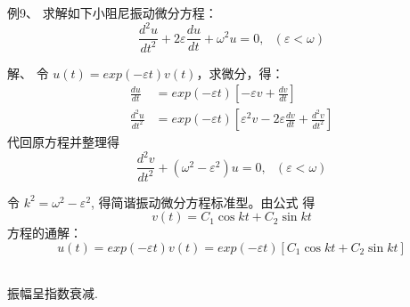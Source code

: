 \begin{frame}
	\begin{exampleblock} {例9、	求解如下小阻尼振动微分方程：}
	\begin{equation*}
		\frac{d^2 u}{d t^2} +2\varepsilon \frac{d u}{dt} +\omega ^2 u = 0 ,  ~~~ (\varepsilon < \omega)   
	\end{equation*}
	\end{exampleblock} 
	\alert{解、} 令 $\displaystyle  u(t)= exp(-\varepsilon t) v(t) $，求微分，得：\\	
	\begin{align*}
		\frac{d u}{d t } & =exp(-\varepsilon t) [-\varepsilon v +\frac{d v}{dt}]\\
		\frac{d^2 u}{d t^2 } & =exp(-\varepsilon t) [\varepsilon ^2 v -2\varepsilon \frac{d v}{dt}+ \frac{d^2 v}{dt^2} ]
	\end{align*}
	代回原方程并整理得
	\begin{equation*}
		\frac{d^2 v}{d t^2} +(\omega ^2 - \varepsilon ^2) u = 0,  ~~~ (\varepsilon < \omega)   
	\end{equation*}
\end{frame}

\begin{frame}	
	令 $k^2 =\omega ^2 - \varepsilon ^2 $, 得简谐振动微分方程标准型。由公式 得
	\begin{equation*}
		v(t)=C_1 \cos k t +C_2 \sin k t 
	\end{equation*}
	方程的通解： 
	\begin{equation*}
		u(t)= exp(-\varepsilon t) v(t) =exp(-\varepsilon t) [ C_1 \cos k t +C_2 \sin k t] 
	\end{equation*}	
\end{frame}

\begin{frame}	
	\\
	振幅呈指数衰减.
\end{frame}


